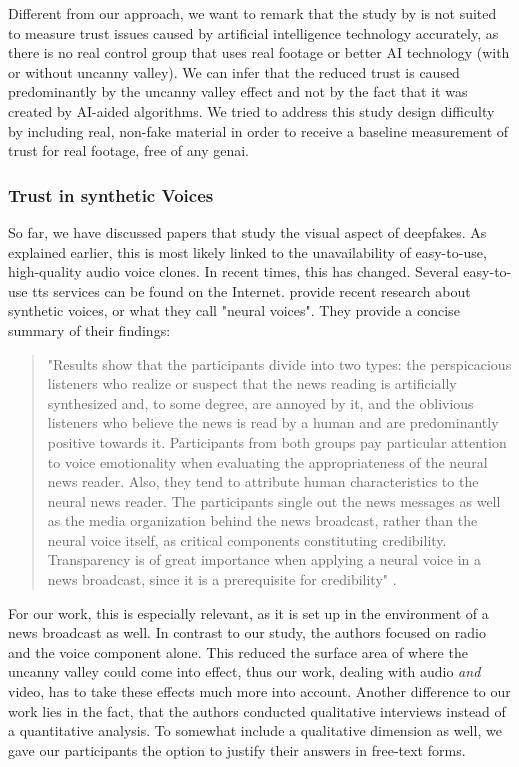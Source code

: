 \documentclass[
  a4paper,  %
  twoside,  %
  bibliography=totoc,
  headsepline,
  cleardoublepage=empty,
  parskip=half,
  draft=false
]{scrbook}
\begin{document}
Different from our approach, we want to remark that the study by  is not suited to measure trust issues caused by artificial intelligence technology accurately, as there is no real control group that uses real footage or better AI technology (with or without uncanny valley). We can infer that the reduced trust is caused predominantly by the uncanny valley effect and not by the fact that it was created by AI-aided algorithms. We tried to address this study design difficulty by including real, non-fake material in order to receive a baseline measurement of trust for real footage, free of any \gls{genai}.

\subsubsection*{Trust in synthetic Voices}
So far, we have discussed papers that study the visual aspect of deepfakes. As explained earlier, this is most likely linked to the unavailability of easy-to-use, high-quality audio voice clones. In recent times, this has changed. Several easy-to-use \gls{tts} services can be found on the Internet.  provide recent research about synthetic voices, or what they call "neural voices". They provide a concise summary of their findings: 

\begin{quotation}
"Results show that the participants divide into two types: the perspicacious listeners who realize or suspect that the news reading is artificially synthesized and, to some degree, are annoyed by it, and the oblivious listeners who believe the news is read by a human and are predominantly positive towards it. Participants from both groups pay particular attention to voice emotionality when evaluating the appropriateness of the neural news reader. Also, they tend to attribute human characteristics to the neural news reader. The participants single out the news messages as well as the media organization behind the news broadcast, rather than the neural voice itself, as critical components constituting credibility. Transparency is of great importance when applying a neural voice in a news broadcast, since it is a prerequisite for credibility" \cite[p. 1]{heiselbergAutomatedNewsReading2022}.
\end{quotation} 

For our work, this is especially relevant, as it is set up in the environment of a news broadcast as well. In contrast to our study, the authors focused on radio and the voice component alone. This reduced the surface area of where the uncanny valley could come into effect, thus our work, dealing with audio \textit{and} video, has to take these effects much more into account. Another difference to our work lies in the fact, that the authors conducted qualitative interviews instead of a quantitative analysis. To somewhat include a qualitative dimension as well, we gave our participants the option to justify their answers in free-text forms. 
\end{document}

